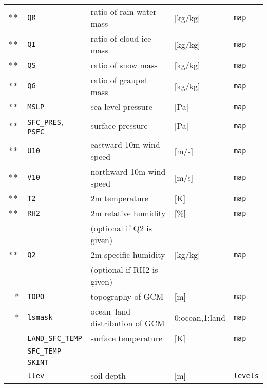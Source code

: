 {\begin{table}[bth]
\begin{center}
\begin{tabularx}{150mm}{rl|l|l|X}
$\ast\ast$ &\verb|QR|      & ratio of rain water mass         & [kg/kg]        & \verb|map|         \\
$\ast\ast$ &\verb|QI|      & ratio of cloud ice mass          & [kg/kg]        & \verb|map|         \\
$\ast\ast$ &\verb|QS|      & ratio of snow mass               & [kg/kg]        & \verb|map|         \\
$\ast\ast$ &\verb|QG|      & ratio of graupel mass            & [kg/kg]        & \verb|map|         \\
$\ast\ast$ &\verb|MSLP|    & sea level pressure               & [Pa]           & \verb|map|         \\
$\ast\ast$ &\verb|SFC_PRES|, \verb|PSFC| & surface pressure                 & [Pa]           & \verb|map|         \\
$\ast\ast$ &\verb|U10|     & eastward 10m wind speed          & [m/s]          & \verb|map|         \\
$\ast\ast$ &\verb|V10|     & northward 10m wind speed         & [m/s]          & \verb|map|         \\
$\ast\ast$ &\verb|T2|      & 2m temperature                   & [K]            & \verb|map|         \\
$\ast\ast$ &\verb|RH2|     & 2m relative humidity             & [\%]           & \verb|map|         \\
           &               & (optional if Q2 is given)        &                &                    \\
$\ast\ast$ &\verb|Q2|      & 2m specific humidity             & [kg/kg]        & \verb|map|         \\
           &               & (optional if RH2 is given)       &                &                    \\
    $\ast$ &\verb|TOPO|    & topography of GCM                & [m]            & \verb|map|         \\
    $\ast$ &\verb|lsmask|  & ocean--land distribution of GCM  & 0:ocean,1:land & \verb|map|         \\
           &\verb|LAND_SFC_TEMP|  & surface temperature       & [K]            & \verb|map|         \\
           &\verb|SFC_TEMP|&                                  &                &       \\
           &\verb|SKINT|   &                                  &                &       \\
           &\verb|llev|    & soil depth                       & [m]            & \verb|levels|      \\

\end{tabularx}
\end{center}
\end{table}}

